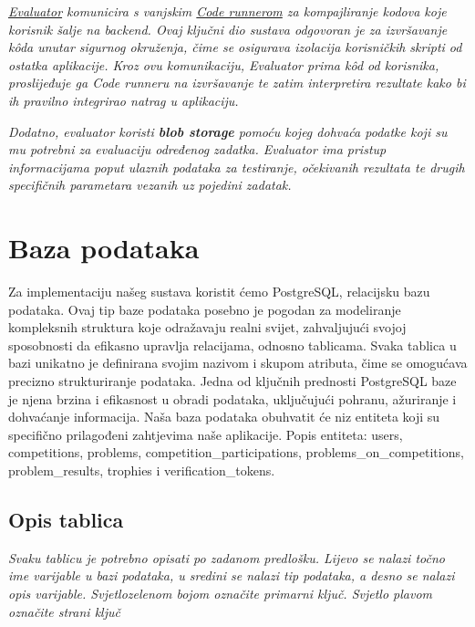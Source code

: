 	\textit{\underline{Evaluator} komunicira s vanjskim \underline{Code runnerom} za kompajliranje kodova koje korisnik šalje
	na backend. Ovaj ključni dio sustava odgovoran je za izvršavanje kôda unutar sigurnog okruženja, čime se osigurava
	izolacija korisničkih skripti od ostatka aplikacije. Kroz ovu komunikaciju, Evaluator prima kôd od korisnika,
	proslijeđuje ga Code runneru na izvršavanje te zatim interpretira rezultate kako bi ih pravilno integrirao
	natrag u aplikaciju.}

	\textit{Dodatno, evaluator koristi \textbf{blob storage} pomoću kojeg dohvaća podatke koji su mu potrebni za
	evaluaciju određenog zadatka. Evaluator ima pristup informacijama poput ulaznih podataka za testiranje,
	očekivanih rezultata te drugih specifičnih parametara vezanih uz pojedini zadatak.}
	
	\newpage
	
		

		

				
		\section{Baza podataka}
			
		Za implementaciju našeg sustava koristit ćemo PostgreSQL, relacijsku bazu podataka. Ovaj tip baze podataka posebno je pogodan za modeliranje kompleksnih struktura koje odražavaju realni svijet, zahvaljujući svojoj sposobnosti da efikasno upravlja relacijama, odnosno tablicama. Svaka tablica u bazi unikatno je definirana svojim nazivom i skupom atributa, čime se omogućava precizno strukturiranje podataka. Jedna od ključnih prednosti PostgreSQL baze je njena brzina i efikasnost u obradi podataka, uključujući pohranu, ažuriranje i dohvaćanje informacija. Naša baza podataka obuhvatit će niz entiteta koji su specifično prilagođeni zahtjevima naše aplikacije.
		Popis entiteta: users, competitions, problems, competition_participations, problems_on_competitions, problem_results, trophies i verification_tokens.
			\subsection{Opis tablica}
			

				\textit{Svaku tablicu je potrebno opisati po zadanom predlošku. 
				Lijevo se nalazi točno ime varijable u bazi podataka, u sredini se nalazi tip podataka, 
				a desno se nalazi opis varijable. Svjetlozelenom bojom označite primarni ključ. Svjetlo plavom označite strani ključ}
				
